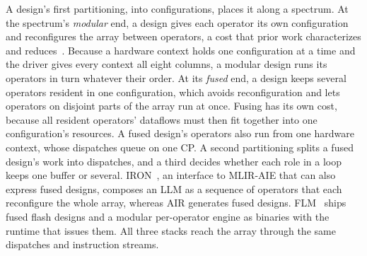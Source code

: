 A design's first partitioning, into configurations, places it along a spectrum.
At the spectrum's \emph{modular} end, a design gives each operator its own configuration and reconfigures the array between operators, a cost that prior work characterizes and reduces~\citep{vandelm2026configwall}.
Because a hardware context holds one configuration at a time and the driver gives every context all eight columns, a modular design runs its operators in turn whatever their order.
At its \emph{fused} end, a design keeps several operators resident in one configuration, which avoids reconfiguration and lets operators on disjoint parts of the array run at once.
Fusing has its own cost, because all resident operators' dataflows must then fit together into one configuration's resources.
A fused design's operators also run from one hardware context, whose dispatches queue on one CP.
A second partitioning splits a fused design's work into dispatches, and a third decides whether each role in a loop keeps one buffer or several.
IRON~\citep{hunhoff2025iron}, an interface to MLIR-AIE that can also express fused designs, composes an LLM as a sequence of operators that each reconfigure the whole array, whereas AIR generates fused designs.
FLM~\citep{fastflowlm-repo} ships fused flash designs and a modular per-operator engine as binaries with the runtime that issues them.
All three stacks reach the array through the same dispatches and instruction streams.

